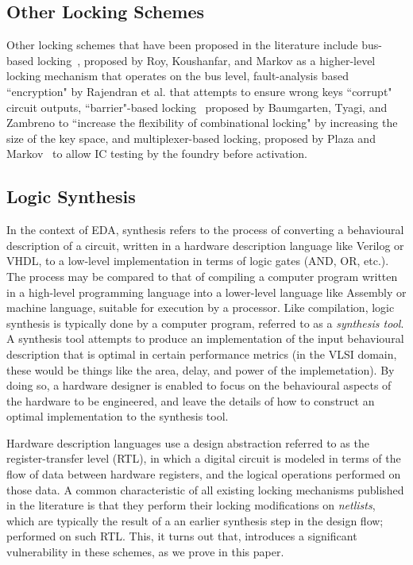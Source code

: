 \subsection{Other Locking Schemes}
Other locking schemes that have been proposed in the literature include bus-based locking~\cite{roy2008protecting}, proposed by Roy, Koushanfar, and Markov as a higher-level locking mechanism that operates on the bus level, fault-analysis based ``encryption" by Rajendran et al. \cite{rajendran2015fault,rajendran2012logic} that attempts to ensure wrong keys ``corrupt" circuit outputs, ``barrier"-based locking~\cite{baumgartenpreventing} proposed by Baumgarten, Tyagi, and Zambreno to ``increase the flexibility of combinational locking" by increasing the size of the key space, and multiplexer-based locking, proposed by Plaza and Markov~\cite{plaza2015solving} to allow IC testing by the foundry before activation.

\subsection{Logic Synthesis}
In the context of EDA, synthesis refers to the process of converting a behavioural description of a circuit, written in a hardware description language like Verilog or VHDL, to a low-level implementation in terms of logic gates (AND, OR, etc.). The process may be compared to that of compiling a computer program written in a high-level programming language into a lower-level language like Assembly or machine language, suitable for execution by a processor. Like compilation, logic synthesis is typically done by a computer program, referred to as a \emph{synthesis tool}. A synthesis tool attempts to produce an implementation of the input behavioural description that is optimal in certain performance metrics (in the VLSI domain, these would be things like the area, delay, and power of the implemetation). By doing so, a hardware designer is enabled to focus on the behavioural aspects of the hardware to be engineered, and leave the details of how to construct an optimal implementation to the synthesis tool. 

Hardware description languages use a design abstraction referred to as the register-transfer level (RTL), in which a digital circuit is modeled in terms of the flow of data between hardware registers, and the logical operations performed on those data. 
A common characteristic of all existing locking mechanisms published in the literature is that they perform their locking modifications on \emph{netlists}, which are typically the result of a an earlier synthesis step in the design flow; performed on such RTL. This, it turns out that, introduces a significant vulnerability in these schemes, as we prove in this paper.


